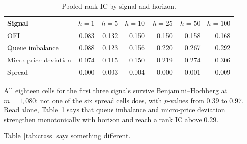 \documentclass[11pt]{scrartcl}
\begin{document}
\begin{table}[H]
\centering
\caption{Pooled rank IC by signal and horizon.}
\label{tab:pooled}
\begin{tabular}{lrrrrrr}
\toprule
Signal & $h{=}1$ & $h{=}5$ & $h{=}10$ & $h{=}25$ & $h{=}50$ & $h{=}100$ \\
\midrule
OFI                   & 0.083 & 0.132 & 0.150 & 0.150 & 0.158 & 0.168 \\
Queue imbalance       & 0.088 & 0.123 & 0.156 & 0.220 & 0.267 & 0.292 \\
Micro-price deviation & 0.074 & 0.115 & 0.150 & 0.219 & 0.274 & 0.306 \\
Spread                & 0.000 & 0.003 & 0.004 & $-0.000$ & $-0.001$ & 0.009 \\
\bottomrule
\end{tabular}
\end{table}

All eighteen cells for the first three signals survive Benjamini--Hochberg at $m = 1{,}080$; not one of the six spread cells does, with $p$-values from $0.39$ to $0.97$. Read alone, Table~\ref{tab:pooled} says that queue imbalance and micro-price deviation strengthen monotonically with horizon and reach a rank IC above 0.29.

Table~\ref{tab:cross} says something different.
\end{document}
